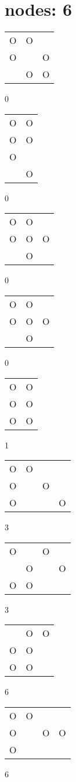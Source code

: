\section{nodes: 6}
\begin{tabular}{|m{0.2cm}m{0.2cm}m{0.2cm}|}\hline
O&O& \\
O& &O\\
 &O&O\\
\hline\end{tabular}0
\begin{tabular}{|m{0.2cm}m{0.2cm}|}\hline
O&O\\
O&O\\
O& \\
 &O\\
\hline\end{tabular}0
\begin{tabular}{|m{0.2cm}m{0.2cm}m{0.2cm}|}\hline
O&O& \\
O&O&O\\
 &O& \\
\hline\end{tabular}0
\begin{tabular}{|m{0.2cm}m{0.2cm}m{0.2cm}|}\hline
O&O& \\
O&O&O\\
 &O& \\
\hline\end{tabular}0
\begin{tabular}{|m{0.2cm}m{0.2cm}|}\hline
O&O\\
O&O\\
O&O\\
\hline\end{tabular}1
\begin{tabular}{|m{0.2cm}m{0.2cm}m{0.2cm}m{0.2cm}|}\hline
O&O& & \\
O& &O& \\
O& & &O\\
\hline\end{tabular}3
\begin{tabular}{|m{0.2cm}m{0.2cm}m{0.2cm}m{0.2cm}|}\hline
O& &O& \\
 &O& &O\\
O&O& & \\
\hline\end{tabular}3
\begin{tabular}{|m{0.2cm}m{0.2cm}m{0.2cm}|}\hline
 &O&O\\
O&O& \\
O&O& \\
\hline\end{tabular}6
\begin{tabular}{|m{0.2cm}m{0.2cm}m{0.2cm}m{0.2cm}|}\hline
O&O& & \\
O& &O&O\\
O& & & \\
\hline\end{tabular}6
